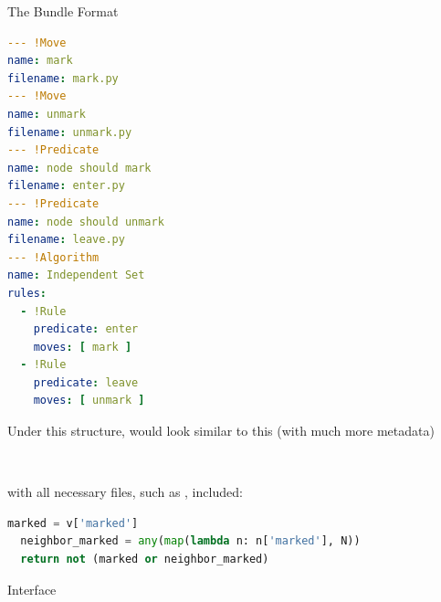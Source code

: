\documentclass{beamer}
\begin{document}
\begin{frame}[fragile,t]
\begin{columns}[t]
\begin{column}{.45\textwidth}
\begin{block}{The Bundle Format}
        \begin{minipage}{\linewidth}
          \hfill
          \begin{minipage}{5in}
\begin{lstlisting}[language=yaml,basicstyle=\ttfamily\YAMLkeystyle\large]
--- !Move
name: mark
filename: mark.py
--- !Move
name: unmark
filename: unmark.py
--- !Predicate
name: node should mark
filename: enter.py
--- !Predicate
name: node should unmark
filename: leave.py
--- !Algorithm
name: Independent Set
rules:
  - !Rule
    predicate: enter
    moves: [ mark ]
  - !Rule
    predicate: leave
    moves: [ unmark ]
\end{lstlisting}
          \end{minipage}
          \hfill
          \begin{minipage}{5in}
            \raggedright
            Under this structure, \IndSet would look similar to this
            (with much more metadata)

            \vspace{2in}

            \large
            \linespread{1.1}

            
          \end{minipage}
          \hfill
          ~
        \end{minipage}

        with all necessary files, such as , included:
        \vspace{.3in}
\begin{lstlisting}[language=Python,stringstyle=\color{green!50!black},keywordstyle=\color{blue},basicstyle=\ttfamily\large]
  marked = v['marked']
  neighbor_marked = any(map(lambda n: n['marked'], N))
  return not (marked or neighbor_marked)
\end{lstlisting}
      \end{block}
      
      \begin{block}{Interface}


\end{block}
\end{column}
\end{columns}
\end{frame}
\end{document}
